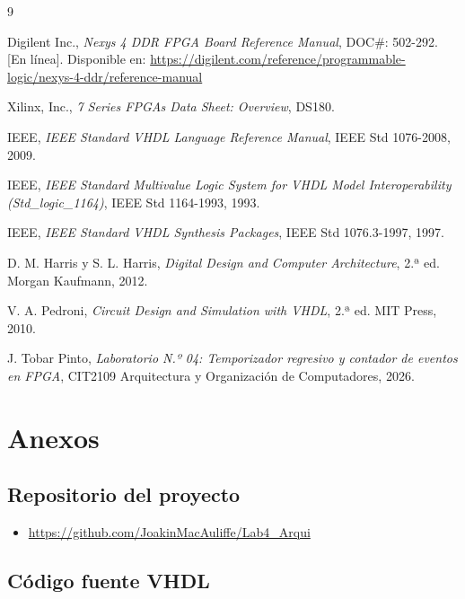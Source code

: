 \documentclass[letterpaper,12pt]{article}
\begin{document}
\newpage
\begin{thebibliography}{9}

Digilent Inc., \emph{Nexys 4 DDR FPGA Board Reference Manual}, DOC\#: 502-292. [En línea]. Disponible en: \url{https://digilent.com/reference/programmable-logic/nexys-4-ddr/reference-manual}

Xilinx, Inc., \emph{7 Series FPGAs Data Sheet: Overview}, DS180.

IEEE, \emph{IEEE Standard VHDL Language Reference Manual}, IEEE Std 1076-2008, 2009.

IEEE, \emph{IEEE Standard Multivalue Logic System for VHDL Model Interoperability (Std\_logic\_1164)}, IEEE Std 1164-1993, 1993.

IEEE, \emph{IEEE Standard VHDL Synthesis Packages}, IEEE Std 1076.3-1997, 1997.

D. M. Harris y S. L. Harris, \emph{Digital Design and Computer Architecture}, 2.ª ed. Morgan Kaufmann, 2012.

V. A. Pedroni, \emph{Circuit Design and Simulation with VHDL}, 2.ª ed. MIT Press, 2010.

J. Tobar Pinto, \emph{Laboratorio N.º 04: Temporizador regresivo y contador de eventos en FPGA}, CIT2109 Arquitectura y Organización de Computadores, 2026.

\end{thebibliography}

\newpage
\section{Anexos}

\subsection{Repositorio del proyecto}

\begin{itemize}
    \item \url{https://github.com/JoakinMacAuliffe/Lab4_Arqui}
\end{itemize}

\subsection{Código fuente VHDL}
\end{document}
